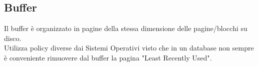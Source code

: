 \subsection{Buffer}
Il buffer \`e organizzato in pagine della stessa dimensione delle pagine/blocchi su disco.\\
Utilizza policy diverse dai Sistemi Operativi visto che in un database non sempre \`e conveniente rimuovere dal buffer la pagina "Least Recently Used".